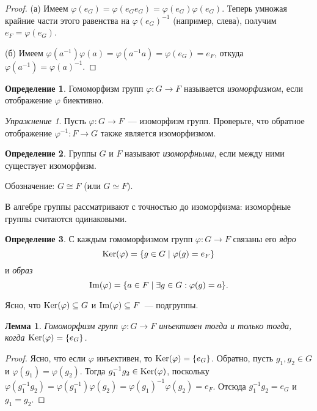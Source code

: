 \documentclass[a4paper,10pt]{amsart}
\def\Ker{{\rm Ker}}%
\def\Im{{\rm Im}}%
\newtheorem{lemma}{Лемма}
\theoremstyle{definition}
\newtheorem{definition}{Определение}
\theoremstyle{remark}
\newtheorem{exc}{Упражнение}
\begin{document}
\vspace{-5mm}

\begin{proof}
(а) Имеем $\varphi(e_G)=\varphi(e_Ge_G)=\varphi(e_G)\varphi(e_G)$.
Теперь умножая крайние части этого равенства на $\varphi(e_G)^{-1}$
(например, слева), получим $e_F = \varphi(e_G)$.

(б) Имеем $\varphi(a^{-1}) \varphi(a) = \varphi(a^{-1}a) =
\varphi(e_G) = e_F$, откуда $\varphi(a^{-1}) = \varphi(a)^{-1}$.
\end{proof}

\begin{definition}
Гомоморфизм групп $\varphi\colon G\to F$ называется {\it
изоморфизмом}, если отображение $\varphi$ биективно.
\end{definition}

\begin{exc}
Пусть $\varphi\colon G\to F$~--- изоморфизм групп. Проверьте, что
обратное отображение $\varphi^{-1}\colon F \to G$ также является
изоморфизмом.
\end{exc}

\begin{definition}
Группы $G$ и $F$ называют {\it изоморфными}, если между ними
существует изоморфизм.

Обозначение: $G\cong F$ (или $G \simeq F$).
\end{definition}

В алгебре группы рассматривают с точностью до изоморфизма:
изоморфные группы считаются \guillemotleft
одинаковыми\guillemotright{}.

\begin{definition}
С каждым гомоморфизмом групп $\varphi\colon G\to F$ связаны его {\it
ядро}
$$
\Ker(\varphi)=\{g\in G \mid \varphi(g)=e_F\}
$$
и {\it образ}
$$
\Im(\varphi)=\{a\in F \mid \exists g\in G : \varphi(g)=a\}.
$$
\end{definition}

Ясно, что $\Ker(\varphi)\subseteq G$ и $\Im(\varphi)\subseteq F$~---
подгруппы.

\begin{lemma}
Гомоморфизм групп $\varphi \colon G \to F$ инъективен тогда и только
тогда, когда $\Ker(\varphi) = \{e_G\}$.
\end{lemma}
\vspace{-3mm}
\begin{proof}
Ясно, что если $\varphi$ инъективен, то $\Ker(\varphi) = \lbrace e_G
\rbrace$. Обратно, пусть $g_1, g_2 \in G$ и $\varphi(g_1) =
\varphi(g_2)$. Тогда $g_1^{-1} g_2 \in \Ker(\varphi)$, поскольку
$\varphi(g_1^{-1} g_2) = \varphi(g_1^{-1}) \varphi(g_2) =
\varphi(g_1)^{-1} \varphi (g_2) = e_F$. Отсюда $g_1^{-1}g_2 = e_G$ и
$g_1 = g_2$.
\end{proof}
\end{document}
